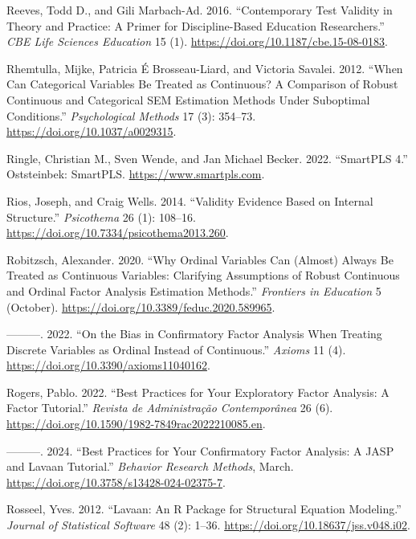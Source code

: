 \documentclass[
  a4paper,
]{article}
\newlength{\cslhangindent}
\newenvironment{CSLReferences}[2] %
 {\begin{list}{}{%
  \setlength{\itemindent}{0pt}
  \setlength{\leftmargin}{0pt}
  \setlength{\parsep}{0pt}
  \ifodd #1
   \setlength{\leftmargin}{\cslhangindent}
   \setlength{\itemindent}{-1\cslhangindent}
  \fi
  \setlength{\itemsep}{#2\baselineskip}}}
 {\end{list}}
\begin{document}
\begin{CSLReferences}{1}{0}
Reeves, Todd D., and Gili Marbach-Ad. 2016. {``Contemporary Test
Validity in Theory and Practice: {A} Primer for Discipline-Based
Education Researchers.''} \emph{CBE Life Sciences Education} 15 (1).
\url{https://doi.org/10.1187/cbe.15-08-0183}.

Rhemtulla, Mijke, Patricia É Brosseau-Liard, and Victoria Savalei. 2012.
{``When Can Categorical Variables Be Treated as Continuous? {A}
Comparison of Robust Continuous and Categorical {SEM} Estimation Methods
Under Suboptimal Conditions.''} \emph{Psychological Methods} 17 (3):
354--73. \url{https://doi.org/10.1037/a0029315}.

Ringle, Christian M., Sven Wende, and Jan Michael Becker. 2022.
{``{SmartPLS} 4.''} Oststeinbek: SmartPLS.
\url{https://www.smartpls.com}.

Rios, Joseph, and Craig Wells. 2014. {``Validity Evidence Based on
Internal Structure.''} \emph{Psicothema} 26 (1): 108--16.
\url{https://doi.org/10.7334/psicothema2013.260}.

Robitzsch, Alexander. 2020. {``Why {Ordinal Variables Can} ({Almost})
{Always Be Treated} as {Continuous Variables}: {Clarifying Assumptions}
of {Robust Continuous} and {Ordinal Factor Analysis Estimation
Methods}.''} \emph{Frontiers in Education} 5 (October).
\url{https://doi.org/10.3389/feduc.2020.589965}.

---------. 2022. {``On the {Bias} in {Confirmatory Factor Analysis When
Treating Discrete Variables} as {Ordinal Instead} of {Continuous}.''}
\emph{Axioms} 11 (4). \url{https://doi.org/10.3390/axioms11040162}.

Rogers, Pablo. 2022. {``Best {Practices} for {Your Exploratory Factor
Analysis}: {A Factor Tutorial}.''} \emph{Revista de Administra{ç}{ã}o
Contempor{â}nea} 26 (6).
\url{https://doi.org/10.1590/1982-7849rac2022210085.en}.

---------. 2024. {``Best Practices for Your Confirmatory Factor
Analysis: {A JASP} and Lavaan Tutorial.''} \emph{Behavior Research
Methods}, March. \url{https://doi.org/10.3758/s13428-024-02375-7}.

Rosseel, Yves. 2012. {``Lavaan: {An R} Package for Structural Equation
Modeling.''} \emph{Journal of Statistical Software} 48 (2): 1--36.
\url{https://doi.org/10.18637/jss.v048.i02}.


\end{CSLReferences}
\end{document}
